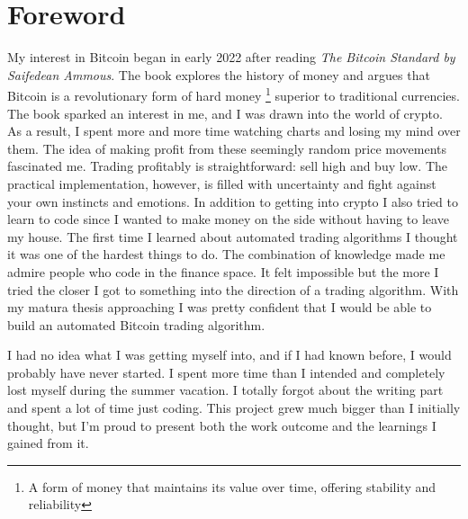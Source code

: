 \documentclass[12pt]{article}
\begin{document}
\section*{Foreword}
My interest in Bitcoin began in early 2022 after reading \textit{The Bitcoin Standard by Saifedean Ammous}. The book explores the history of money and argues that Bitcoin is a revolutionary form of hard money \footnote{A form of money that maintains its value over time, offering stability and reliability} superior to traditional currencies. The book sparked an interest in me, and I was drawn into the world of crypto. As a result, I spent more and more time watching charts and losing my mind over them. The idea of making profit from these seemingly random price movements fascinated me.
Trading profitably is straightforward: sell high and buy low. The practical implementation, however, is filled with uncertainty and  fight against your own instincts and emotions.
In addition to getting into crypto I also tried to learn to code since I wanted to make money on the side without having to leave my house. The first time I learned about automated trading algorithms I thought it was one of the hardest things to do. The combination of knowledge made me admire people who code in the finance space. It felt impossible but the more I tried the closer I got to something into the direction of a trading algorithm. With my matura thesis approaching I was pretty confident that I would be able to build an automated Bitcoin trading algorithm. 






I had no idea what I was getting myself into, and if I had known before, I would probably have never started. I spent more time than I intended and completely lost myself during the summer vacation. I totally forgot about the writing part and spent a lot of time just coding. This project grew much bigger than I initially thought, but I'm proud to present both the work outcome and the learnings I gained from it.





\clearpage

\tableofcontents
\clearpage

\setcounter{page}{1}
\end{document}

